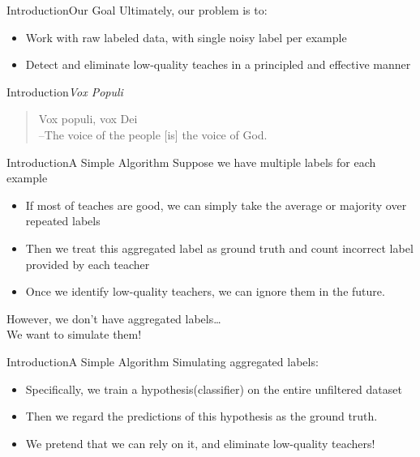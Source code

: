 \documentclass[10pt,table,mathserif]{beamer}
\begin{document}
\begin{frame}{Introduction}{Our Goal}
  Ultimately, our problem is to:
  \begin{itemize}
    \item Work with raw labeled data, with \alert{single noisy label per example}
    \item Detect and eliminate low-quality teaches in a \alert{principled} and \alert{effective} manner
  \end{itemize}
\end{frame}

\begin{frame}{Introduction}{\textsl{Vox Populi}}
  \begin{quote}
    \large
    \alert{Vox populi, vox Dei}\\
    --The voice of the people [is] the voice of God.
  \end{quote}
\end{frame}


\begin{frame}{Introduction}{A Simple Algorithm}
  Suppose we have \alert{multiple labels} for each example \pause
  \begin{itemize}
    \item If most of teaches are good, we can simply take the \alert{average or majority} over repeated labels  \pause
    \item Then we treat this \alert{aggregated label} as ground truth and count incorrect label provided by each teacher \pause
    \item Once we identify low-quality teachers, we can ignore them in the future. \pause
  \end{itemize}
  \begin{center}
  However, we don't have aggregated labels\ldots \\\pause
  \Large We want to \alert{simulate} them!
  \end{center}
\end{frame}

\begin{frame}{Introduction}{A Simple Algorithm}
  Simulating aggregated labels:\pause
  \begin{itemize}
    \item Specifically, we train a hypothesis(classifier) on the entire unfiltered dataset \pause
    \item Then we regard the predictions of this hypothesis as the ground truth. \pause
    \item We \alert{pretend} that we can rely on it, and eliminate low-quality teachers!
  \end{itemize}
\end{frame}
\end{document}
